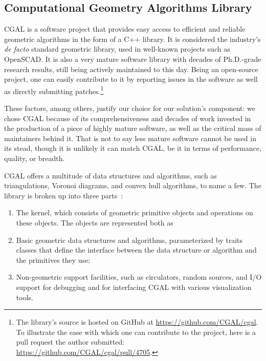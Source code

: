 \subsection{Computational Geometry Algorithms Library}%
\label{sec:solution.impl.cgal}

\Ac{CGAL} is a software project that provides easy access to efficient and
reliable geometric algorithms in the form of a C++ library.  It is considered
the industry's \textit{de facto} standard geometric library, used in well-known
projects such as OpenSCAD.  It is also a very mature software library with
decades of Ph.D.-grade research results, still being actively maintained to this
day.  Being an open-source project, one can easily contribute to it by reporting
issues in the software as well as directly submitting patches.\footnote{The
library's source is hosted on GitHub at \url{https://github.com/CGAL/cgal}.  To
illustrate the ease with which one can contribute to the project, here is a pull
request the author submitted: \url{https://github.com/CGAL/cgal/pull/4705}.}

These factors, among others, justify our choice for our solution's
\geomlibrary{} component: we chose \ac{CGAL} because of its comprehensiveness
and decades of work invested in the production of a piece of highly mature
software, as well as the critical mass of maintainers behind it.  That is not to
say less mature software cannot be used in its stead, though it is unlikely it
can match \ac{CGAL}, be it in terms of performance, quality, or breadth.

\ac{CGAL} offers a multitude of data structures and algorithms, such as
triangulations, Voronoi diagrams, and convex hull algorithms, to name a few.
The library is broken up into three parts~\cite{CGAL:5.3:23LGK}:
\begin{enumerate}
  \item The kernel, which consists of geometric primitive objects and operations
  on these objects.  The objects are represented both as
  \item Basic geometric data structures and algorithms, parameterized by traits
  classes that define the interface between the data structure or algorithm and
  the primitives they use;
  \item Non-geometric support facilities, such as circulators, random sources,
  and I/O support for debugging and for interfacing \ac{CGAL} with various
  visualization tools.
\end{enumerate}

